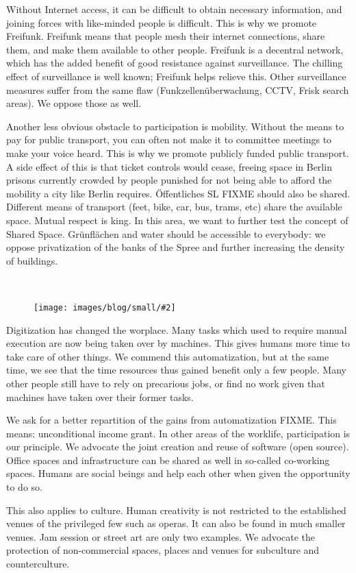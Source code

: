\documentclass[a4paper,10pt]{article}
\newcommand{\mysection}[1]{{\vspace{1cm}\noindent\color{gray}{\ttfamily\LARGE\raggedright #1}\\\medskip}}
\newcommand{\abschnitt}[2]{%
\mysection{\raggedright #1}%
\begin{figure}[t]%
\vspace*{-2.7cm}%
\hspace*{-2.1cm}%
\texttt{[image: images/blog/small/\#2]} %
\end{figure}%
}
\begin{document}
Without Internet access, it can be difficult to obtain necessary information, and joining forces with like-minded people is difficult. This is why we promote Freifunk. Freifunk means that people mesh their internet connections, share them, and make them available to other people. Freifunk is a decentral network, which has the added benefit of good resistance against surveillance. The chilling effect of surveillance is well known; Freifunk helps relieve this. Other surveillance measures suffer from the same flaw (Funkzellenüberwachung, CCTV, Frisk search areas). We oppose those as well. 

Another less obvious obstacle to participation is mobility. Without the means to pay for public transport, you can often not make it to committee meetings to make your voice heard. This is why we promote publicly funded public transport. A side effect of this is that ticket controls would cease, freeing space in Berlin prisons currently crowded by people punished for not being able to afford the mobility a city like Berlin requires. 
Öffentliches SL FIXME should also be shared. Different means of transport (feet, bike, car, bus, trams, etc) share the available space. Mutual respect is king. In this area, we want to further test the concept of Shared Space. Grünflächen and water should be accessible to everybody: we oppose privatization of the banks of the Spree and further increasing the density of buildings.

\abschnitt{}{plakat_katze.png}

Digitization has changed the worplace. Many tasks which used to require manual execution are now being taken over by machines. This gives humans more time to take care of other things. We commend this automatization, but at the same time, we see that the time resources thus gained benefit only a few people. Many other people still have to rely on precarious jobs, or find no work given that machines have taken over their former tasks. 

We ask for a better repartition of the gains from automatization FIXME. This means: unconditional income grant. In other areas of the worklife, participation is our principle. We advocate the joint creation and reuse of software (open source). Office spaces and infrastructure can be shared as well in so-called co-working spaces. Humans are social beings and help each other when given the opportunity to do so. 

This also applies to culture. Human creativity is not restricted to the established venues of the privileged few such as operas. It can also be found in much smaller venues. Jam session or street art are only two examples. We advocate the protection of non-commercial spaces, places and venues for subculture and counterculture. 
\end{document}
